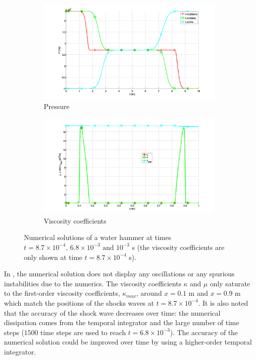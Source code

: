 \documentclass{mc2015}
\begin{document}
\begin{figure}[H]
        \begin{subfigure}[b]{0.495\textwidth}
                \centering
                \includegraphics[width=\textwidth]{figures/Plot_pressure_single_phase.png}
                \caption{Pressure}
                \label{fig:single-phase-press}
        \end{subfigure}        
        \begin{subfigure}[b]{0.495\textwidth}
                \centering
                \includegraphics[width=\textwidth]{figures/Plot_viscosity_single_phase.png}
                \caption{Viscosity coefficients}
                \label{fig:single-phase-visc}
        \end{subfigure}
        \caption{Numerical solutions of a water hammer at times $t=8.7 \times 10^{-4}, \, 6.8 \times 10^{-3} \text{ and } 10^{-3}$ s (the viscosity coefficients are only shown at time $t=8.7 \times 10^{-4}$ s).}\label{fig:single-phase}
\end{figure}
%
In , the numerical solution does not display any oscillations or any spurious instabilities due to the numerics. The viscosity coefficients $\kappa$ and $\mu$ only saturate to the first-order viscosity coefficients, $\kappa_{max}$, around $x=0.1$ m and $x=0.9$ m which match the positions of the shocks waves at $t=8.7 \times 10^{-4}$. It is also noted that the accuracy of the shock wave decreases over time: the numerical dissipation comes from the temporal integrator and the large number of time steps ($1500$ time steps are used to reach $t=6.8 \times 10^{-3}$). The accuracy of the numerical solution could be improved over time by using a higher-order temporal integrator.%
%
\end{document}
